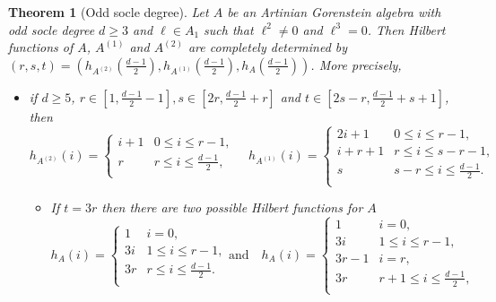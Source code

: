 \documentclass[12pt]{amsart}
\numberwithin{equation}{section}
\theoremstyle{plain} \newtheorem{theorem}{Theorem}[section]
\theoremstyle{definition} \newtheorem{definition}[theorem]{Definition}
\begin{document}
\begin{theorem}[Odd socle degree]\label{3linesHFtheorem-odd}
Let $A$ be an Artinian Gorenstein algebra with odd socle degree $d\geq 3$ and $\ell\in A_1$ such that $\ell^2\neq 0$ and $\ell^3=0$. Then Hilbert functions of $A$, $A^{(1)}$ and $A^{(2)}$ are completely determined by $(r,s,t)=( h_{A^{(2)}}(\frac{d-1}{2}),  h_{A^{(1)}}(\frac{d-1}{2}),  h_{A}(\frac{d-1}{2}))$. More precisely,   
\begin{itemize}
\item[$(1)$] if $d\geq 5$, $r\in [1,\frac{d-1}{2}-1], s\in[2r,\frac{d-1}{2}+r]$ and $t\in [2s-r,\frac{d-1}{2}+s+1]$, then 
\begin{equation}\label{HFodd(1)}
h_{A^{(2)}}(i)=\left\{
                \begin{array}{ll}
                  i+1 & 0\leq i\leq r-1,\\
                  r & r\leq i\leq\frac{d-1}{2},\\
                \end{array}
              \right.\quad
h_{A^{(1)}}(i)=\left\{
                \begin{array}{ll}
                  2i+1 &  0\leq i\leq r-1,\\
                   i+r+1 &  r\leq i\leq s-r-1,\\
                  s & s-r\leq i\leq \frac{d-1}{2}.\\
                \end{array}
              \right.
 \end{equation}
 \begin{itemize}
\item If $t=3r$ then there are two possible Hilbert functions for $A$
\begin{equation}\label{HFoddA(1,1)}
h_{A}(i)=\left\{
                \begin{array}{ll}
                 1 & i=0,\\
                  3i &  1\leq i\leq r-1,\\
                  3r & r\leq i\leq\frac{d-1}{2}.\\
                \end{array}
              \right.
\text{and} \quad 
h_{A}(i)=\left\{
                \begin{array}{ll}
                   1 & i=0,\\
                  3i &  1\leq i\leq r-1,\\
                  3r-1& i=r,\\
                  3r & r+1\leq i\leq \frac{d-1}{2},\\

\end{array}
\end{equation}
\end{itemize}
\end{itemize}
\end{theorem}
\end{document}
